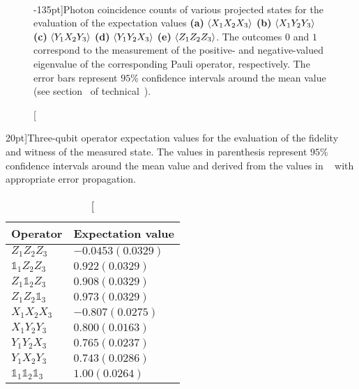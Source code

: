 \begin{figure*}[t!]
	 \\
	\caption[Photon coincidence counts of various projected states][-135pt]{Photon coincidence counts of various projected states for the evaluation of the expectation values \textbf{(a)} $\expval{X_1X_2X_3}$ \textbf{(b)} $\expval{X_1Y_2Y_3}$ \textbf{(c)} $\expval{Y_1X_2Y_3}$ \textbf{(d)} $\expval{Y_1Y_2X_3}$ \textbf{(e)} $\expval{Z_1Z_2Z_3}$. The outcomes $0$ and $1$ correspond to the measurement of the positive- and negative-valued eigenvalue of the corresponding Pauli operator, respectively. The error bars represent $95\%$ confidence intervals around the mean value (see section~\protect{} of technical~\protect{}).}
\end{figure*}

\bigskip

\begin{table}[h!]
	\centering
	\caption[Three-qubit operator expectation values for the evaluation of the fidelity and witness of the generated state][20pt]{Three-qubit operator expectation values for the evaluation of the fidelity and witness of the measured state. The values in parenthesis represent $95\%$ confidence intervals around the mean value and derived from the values in ~\protect{} with appropriate error propagation.}
	\begin{tabular}{ll}
		\toprule
		Operator & Expectation value \\
		\toprule
		$Z_1Z_2Z_3$ & $-0.0453(0.0329)$ \\
		$\mathds{1}_1Z_2Z_3$  & $0.922(0.0329)$\\
		$Z_1\mathds{1}_2Z_3$  & $0.908(0.0329)$\\
		$Z_1Z_2\mathds{1}_3$  & $0.973(0.0329)$\\
		$X_1X_2X_3$ & $-0.807(0.0275)$ \\
		$X_1Y_2Y_3$ & $0.800(0.0163)$ \\
		$Y_1Y_2X_3$ & $0.765(0.0237)$ \\
		$Y_1X_2Y_3$ & $0.743(0.0286)$ \\
		$\mathds{1}_1\mathds{1}_2\mathds{1}_3$ & $1.00(0.0264)$ \\
		\toprule
	\end{tabular}
\end{table}

